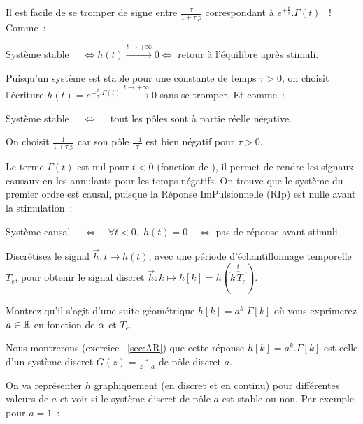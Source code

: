 \begin{remarque}
  Il est facile de se tromper de signe entre
  $\frac{\tau}{1\pm \tau. p}$ correspondant à
  $e^{\pm \frac{t}{\tau}}.\Gamma(t)$ ~! Comme~:

  Système stable $\quad \iff h(t) \xrightarrow{t\to +\infty} 0 \iff$
  \og{}retour à l'équilibre après stimuli. \fg{}

  Puisqu'un système est stable pour une constante de temps $\tau>0$,
  on choisit l'écriture $h(t)=e^{-\frac{t}{\tau}.\Gamma(t)}\xrightarrow{t\to +\infty} 0$ sans se
  tromper. Et comme~:

  Système stable $\quad \iff \quad $ tout les pôles sont à
  partie réelle négative.

  On choisit $\frac{1}{1+\tau.p}$ car son
  pôle $\frac{-1}{\tau}$ est bien négatif pour $\tau >0$.
\end{remarque}

Le terme $\Gamma(t)$ est nul pour $t<0$ (fonction de \Heaviside), il
permet de rendre les signaux causaux en les annulants pour les temps
négatifs. On trouve que le système du premier ordre est causal,
puisque la Réponse ImPulsionnelle (RIp) est nulle avant la
stimulation~:

Système causal $\quad \iff \quad \forall t<0,\; h(t)=0 \quad \iff$
\og{} pas de réponse avant stimuli. \fg

 Discrétisez le signal
$\vec{h} : t\mapsto h(t)$, avec une période d'échantillonnage
temporelle $T_e$, pour obtenir le signal discret
$\vec{h} : k \mapsto h[k]=h(\overbrace{k\,T_e}^{t})$.

Montrez qu'il s'agit d'une suite géométrique $h[k]=a^k.\Gamma[k]$ où
vous exprimerez $a\in\mathbb{R}$ en fonction de $\alpha$ et $T_e$.

\begin{remarque}
  Nous montrerons (exercice ~\ref{sec:AR}) que cette réponse
  $h[k]=a^k.\Gamma[k]$ est celle d'un système discret
  $G(z)=\frac{z}{z-a}$ de pôle discret $a$.
\end{remarque}


On va représenter $h$ graphiquement (en discret et en continu) pour
différentes valeurs de $a$ et voir si le système discret de pôle $a$
est stable ou non. Par exemple pour $a=1$~:

